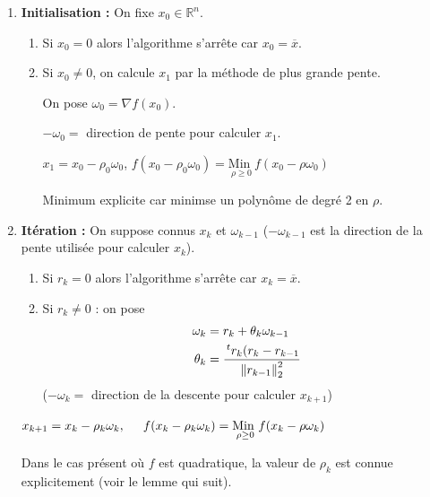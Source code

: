 \documentclass[a4paper,11pt]{article}
\newcommand{\R}{\mathbb{R}}
\newcommand{\norm}[1]{\left\lVert#1\right\rVert}
\newcommand{\tpo}[1]{\,^t#1}
\newcommand{\MinI}[1]{\underset{#1}{\text{Min }}}
\theoremstyle{plain} %
\begin{document}
\begin{enumerate}[label=\textit{\roman*})]
    \item \textbf{Initialisation :}
        On fixe $x_0 \in \R^n$.
        \begin{enumerate}[label=-]
            \item Si $x_0 = 0$ alors l'algorithme s'arrête car $x_0 = \overline{x}$.
            \item Si $x_0 \neq 0$, on calcule $x_1$ par la méthode de plus grande pente.

                On pose $\omega_0 = \nabla f(x_0)$. 
                
                $-\omega_0 =$ direction de pente pour calculer $x_1$.
                
                $x_1 = x_0 - \rho_0 \omega_0$, \hspace{0.5cm}
                $f(x_0 - \rho_0 \omega_0) = \MinI{\rho \geq 0} f(x_0 - \rho \omega_0)$

                \begin{remark}
                    Minimum explicite car minimse un polynôme de degré 2 en $\rho$.
                \end{remark}
        \end{enumerate}

    \item \textbf{Itération :}
        On suppose connus $x_k$ et $\omega_{k-1}$ ($-\omega_{k-1}$ est la direction de la pente
        utilisée pour calculer $x_k$).

        \begin{enumerate}[label=-]
            \item Si $r_k = 0$ alors l'algorithme s'arrête car $x_k = \overline{x}$.

            \item Si $r_k \neq 0$ : on pose
                \begin{align}
                    \omega_k & = r_k + \theta_k \omega_{k-1} \notag\\ 
                    \theta_k & = \frac{\tpo{r_k} (r_k - r_{k-1}}{\norm{r_{k-1}}_2^2}
                    \label{eq:iteration}
                \end{align}
                ($-\omega_k =$ direction de la descente pour calculer $x_{k+1}$)
        \end{enumerate}

        $x_{k+1} = x_k - \rho_k \omega_k, \hspace{0.5cm} f(x_k - \rho_k \omega_k) = \MinI{\rho \geq 0} f(x_k - \rho \omega_k)$

        Dans le cas présent où $f$ est quadratique, la valeur de $\rho_k$ est
        connue explicitement (voir le lemme qui suit).
\end{enumerate}
\end{document}
